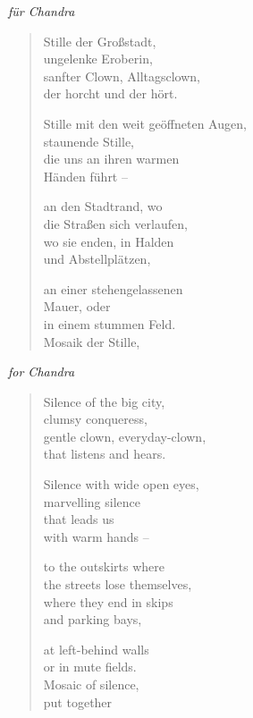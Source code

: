 
\cleartoverso


\hspace{2em}\emph{für Chandra}

\begin{verse}

Stille der Großstadt,\\
ungelenke Eroberin,\\
sanfter Clown, Alltagsclown,\\
der horcht und der hört.

Stille mit den weit geöffneten Augen,\\
staunende Stille,\\
die uns an ihren warmen\\
Händen führt --

an den Stadtrand, wo\\
die Straßen sich verlaufen,\\
wo sie enden, in Halden\\
und Abstellplätzen,

an einer stehengelassenen\\
Mauer, oder\\
in einem stummen Feld.\\
Mosaik der Stille,
\end{verse}

\clearpage


\hspace{2em}\emph{for Chandra}

\begin{verse}

Silence of the big city,\\
clumsy conqueress,\\
gentle clown, everyday-clown,\\
that listens and hears.

Silence with wide open eyes,\\
marvelling silence\\
that leads us\\
with warm hands --

to the outskirts where\\
the streets lose themselves,\\
where they end in skips\\
and parking bays,

at left-behind walls\\
or in mute fields.\\
Mosaic of silence,\\
put together
\end{verse}

